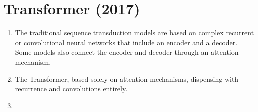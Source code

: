 \chapter{Transformer (2017)}

\begin{tcolorbox}
\end{tcolorbox}



\begin{enumerate}
    \item The traditional sequence transduction models are based on complex recurrent or convolutional neural networks that include an encoder and a decoder.
    Some models also connect the encoder and decoder through an attention mechanism.
    \hfill \cite{arxiv/1706.03762/Attention-Is-All-You-Need}

    \item The Transformer, based solely on attention mechanisms, dispensing with recurrence and convolutions entirely. 
    \hfill \cite{arxiv/1706.03762/Attention-Is-All-You-Need}

    \item 
\end{enumerate}





